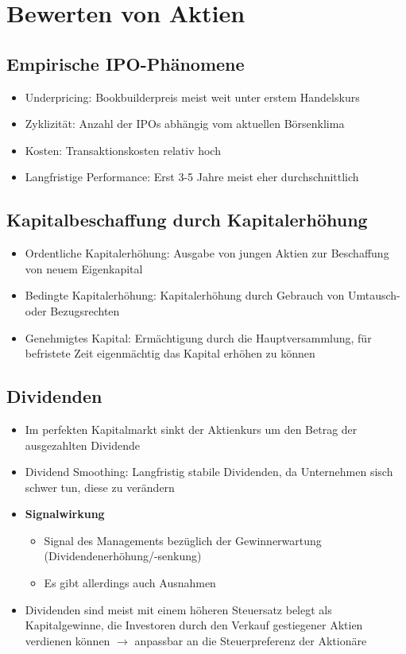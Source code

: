 \section{Bewerten von Aktien}

\subsection{Empirische IPO-Phänomene}
\begin{itemize}
	\item Underpricing: Bookbuilderpreis meist weit unter erstem Handelskurs
	\item Zyklizität: Anzahl der IPOs abhängig vom aktuellen Börsenklima
	\item Kosten: Transaktionskosten relativ hoch
	\item Langfristige Performance: Erst 3-5 Jahre meist eher durchschnittlich
\end{itemize}


\subsection{Kapitalbeschaffung durch Kapitalerhöhung}
\begin{itemize}
	\item Ordentliche Kapitalerhöhung: Ausgabe von jungen Aktien zur Beschaffung von neuem Eigenkapital
	\item Bedingte Kapitalerhöhung: Kapitalerhöhung durch Gebrauch von Umtausch- oder Bezugsrechten
	\item Genehmigtes Kapital: Ermächtigung durch die Hauptversammlung, für befristete Zeit eigenmächtig das Kapital erhöhen zu können
\end{itemize}


\subsection{Dividenden}
\begin{itemize}
	\item Im perfekten Kapitalmarkt sinkt der Aktienkurs um den Betrag der ausgezahlten Dividende
	\item Dividend Smoothing: Langfristig stabile Dividenden, da Unternehmen sisch schwer tun, diese zu verändern
	\item \textbf{Signalwirkung}
	\begin{itemize}
		\item Signal des Managements bezüglich der Gewinnerwartung (Dividendenerhöhung/-senkung)
		\item Es gibt allerdings auch Ausnahmen
	\end{itemize}
	\item Dividenden sind meist mit einem höheren Steuersatz belegt als Kapitalgewinne, die Investoren durch den Verkauf gestiegener Aktien verdienen können $\rightarrow$ anpassbar an die Steuerpreferenz der Aktionäre
\end{itemize}


